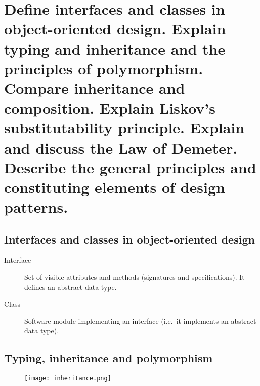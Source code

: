 \clearpage{}

\section{Define interfaces and classes in object-oriented design. Explain
typing and inheritance and the principles of polymorphism. Compare
inheritance and composition. Explain Liskov’s substitutability principle.
Explain and discuss the Law of Demeter. Describe the general principles and
constituting elements of design patterns.}

\subsection{Interfaces and classes in object-oriented design}

\begin{description}

    \item[Interface] Set of visible attributes and methods (signatures
        and specifications). It defines an abstract data type.

    \item[Class] Software module implementing an interface (i.e.\ it
        implements an abstract data type).

\end{description}

\subsection{Typing, inheritance and polymorphism}

\begin{figure}[!ht]
    \centering
    \texttt{[image: inheritance.png]}
\end{figure}

